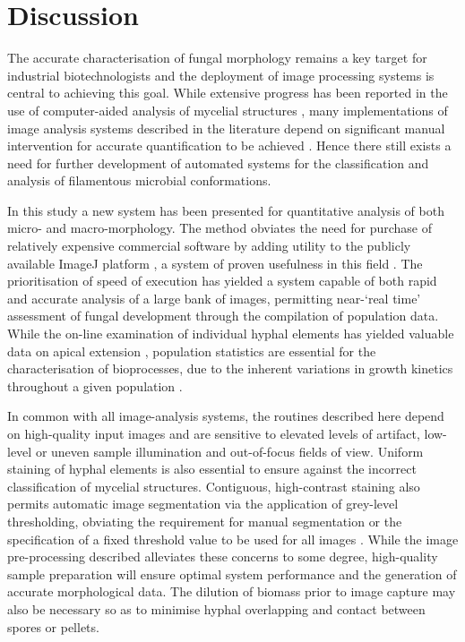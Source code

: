 \section{Discussion}\label{sec:DevImageAnalDisc}

The accurate characterisation of fungal morphology remains a key target for industrial biotechnologists and the deployment of image processing systems is central to achieving this goal. While extensive progress has been reported in the use of computer-aided analysis of mycelial structures \cite{cox1998,papagiannireview}, many implementations of image analysis systems described in the literature depend on significant manual intervention for accurate quantification to be achieved \cite{mcintyre1997,mcintyre1998, wongwicharn1999,wongwicharn1999a,lubbehusen2003,lubbehusen2004,anikster2005,rahardjo2005b,lecault2007,elsabbagh2008}.  Hence there still exists a need for further development of automated systems for the classification and analysis of filamentous microbial conformations.

In this study a new system has been presented for quantitative analysis of both micro- and macro-morphology. The method obviates the need for purchase of relatively expensive commercial software by adding utility to the publicly available ImageJ platform \cite{imagej}, a system of proven usefulness in this field \cite{rahardjo2005b,papagianni2006b}. The prioritisation of speed of execution has yielded a system capable of both rapid and accurate analysis of a large bank of images, permitting near-\lq real time' assessment of fungal development through the compilation of population data. While the on-line examination of individual hyphal elements has yielded valuable data on apical extension \cite{spohr1998}, population statistics are essential for the characterisation of bioprocesses, due to the inherent variations in growth kinetics throughout a given population \cite{paul1993,spohr1998}.

In common with all image-analysis systems, the routines described here depend on high-quality input images and are sensitive to elevated levels of artifact, low-level or uneven sample illumination and out-of-focus fields of view.  Uniform staining of hyphal elements is also essential to ensure against the incorrect classification of mycelial structures. Contiguous, high-contrast staining also permits automatic image segmentation via the application of grey-level thresholding, obviating the requirement for manual segmentation \cite{mcintyre2001} or the specification of a fixed threshold value to be used for all images \cite{hitchcock1996}. While the image pre-processing described alleviates these concerns to some degree, high-quality sample preparation will ensure optimal system performance and the generation of accurate morphological data. The dilution of biomass prior to image capture may also be necessary so as to minimise hyphal overlapping and contact between spores or pellets.

